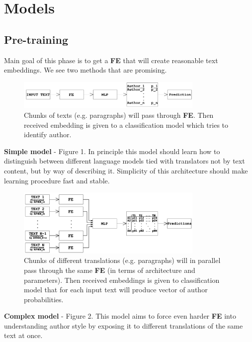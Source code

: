 \documentclass{article}
\begin{document}
\section{Models}
\subsection{Pre-training}
Main goal of this phase is to get a \textbf{FE} that will create reasonable text embeddings. We see two methods that are promising.

\begin{figure}
  \centering
        \includegraphics[width=0.8\textwidth]{Simple_model.png}
        \caption{Chunks of texts (e.g. paragraphs) will pass through \textbf{FE}. Then received embedding is given to a classification model which tries to identify author.}
\end{figure}

\textbf{Simple model} - Figure 1. In principle this model should learn how to distinguish between different language models tied with translators not by text content, but by way of describing it. Simplicity of this architecture should make learning procedure fast and stable.

\begin{figure}
  \centering
        \includegraphics[width=0.8\textwidth]{Complex_model.png}
        \caption{Chunks of different translations (e.g. paragraphs) will in parallel pass through the same \textbf{FE} (in terms of architecture and parameters). Then received embeddings is given to classification model that for each input text will produce vector of author probabilities.}
\end{figure}

\textbf{Complex model} - Figure 2. This model aims to force even harder \textbf{FE} into understanding author style by exposing it to different translations of the same text at once. 
\end{document}
